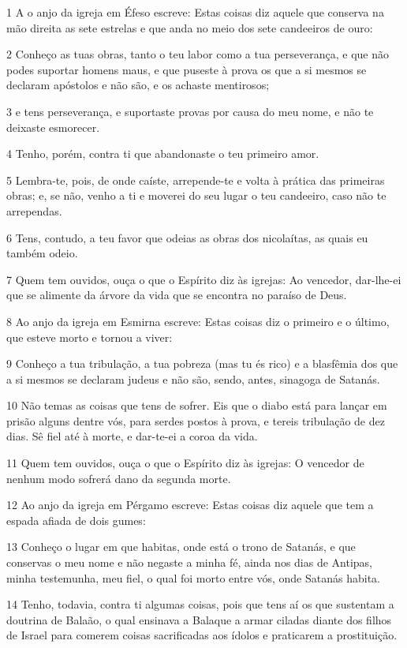 \par 1 A o anjo da igreja em Éfeso escreve: Estas coisas diz aquele que conserva na mão direita as sete estrelas e que anda no meio dos sete candeeiros de ouro:
\par 2 Conheço as tuas obras, tanto o teu labor como a tua perseverança, e que não podes suportar homens maus, e que puseste à prova os que a si mesmos se declaram apóstolos e não são, e os achaste mentirosos;
\par 3 e tens perseverança, e suportaste provas por causa do meu nome, e não te deixaste esmorecer.
\par 4 Tenho, porém, contra ti que abandonaste o teu primeiro amor.
\par 5 Lembra-te, pois, de onde caíste, arrepende-te e volta à prática das primeiras obras; e, se não, venho a ti e moverei do seu lugar o teu candeeiro, caso não te arrependas.
\par 6 Tens, contudo, a teu favor que odeias as obras dos nicolaítas, as quais eu também odeio.
\par 7 Quem tem ouvidos, ouça o que o Espírito diz às igrejas: Ao vencedor, dar-lhe-ei que se alimente da árvore da vida que se encontra no paraíso de Deus.
\par 8 Ao anjo da igreja em Esmirna escreve: Estas coisas diz o primeiro e o último, que esteve morto e tornou a viver:
\par 9 Conheço a tua tribulação, a tua pobreza (mas tu és rico) e a blasfêmia dos que a si mesmos se declaram judeus e não são, sendo, antes, sinagoga de Satanás.
\par 10 Não temas as coisas que tens de sofrer. Eis que o diabo está para lançar em prisão alguns dentre vós, para serdes postos à prova, e tereis tribulação de dez dias. Sê fiel até à morte, e dar-te-ei a coroa da vida.
\par 11 Quem tem ouvidos, ouça o que o Espírito diz às igrejas: O vencedor de nenhum modo sofrerá dano da segunda morte.
\par 12 Ao anjo da igreja em Pérgamo escreve: Estas coisas diz aquele que tem a espada afiada de dois gumes:
\par 13 Conheço o lugar em que habitas, onde está o trono de Satanás, e que conservas o meu nome e não negaste a minha fé, ainda nos dias de Antipas, minha testemunha, meu fiel, o qual foi morto entre vós, onde Satanás habita.
\par 14 Tenho, todavia, contra ti algumas coisas, pois que tens aí os que sustentam a doutrina de Balaão, o qual ensinava a Balaque a armar ciladas diante dos filhos de Israel para comerem coisas sacrificadas aos ídolos e praticarem a prostituição.
